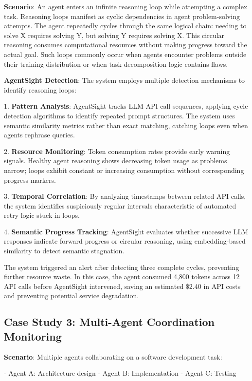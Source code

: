 \documentclass[sigplan,screen，review,9pt]{acmart}
\begin{document}
\textbf{Scenario}: An agent enters an infinite reasoning loop while attempting a complex task. Reasoning loops manifest as cyclic dependencies in agent problem-solving attempts. The agent repeatedly cycles through the same logical chain: needing to solve X requires solving Y, but solving Y requires solving X. This circular reasoning consumes computational resources without making progress toward the actual goal. Such loops commonly occur when agents encounter problems outside their training distribution or when task decomposition logic contains flaws.

\textbf{AgentSight Detection}: The system employs multiple detection mechanisms to identify reasoning loops:

1. \textbf{Pattern Analysis}: AgentSight tracks LLM API call sequences, applying cycle detection algorithms to identify repeated prompt structures. The system uses semantic similarity metrics rather than exact matching, catching loops even when agents rephrase queries.

2. \textbf{Resource Monitoring}: Token consumption rates provide early warning signals. Healthy agent reasoning shows decreasing token usage as problems narrow; loops exhibit constant or increasing consumption without corresponding progress markers.

3. \textbf{Temporal Correlation}: By analyzing timestamps between related API calls, the system identifies suspiciously regular intervals characteristic of automated retry logic stuck in loops.

4. \textbf{Semantic Progress Tracking}: AgentSight evaluates whether successive LLM responses indicate forward progress or circular reasoning, using embedding-based similarity to detect semantic stagnation.

The system triggered an alert after detecting three complete cycles, preventing further resource waste. In this case, the agent consumed 4,800 tokens across 12 API calls before AgentSight intervened, saving an estimated \$2.40 in API costs and preventing potential service degradation.

\subsection{Case Study 3: Multi-Agent Coordination Monitoring}

\textbf{Scenario}: Multiple agents collaborating on a software development task:

- Agent A: Architecture design
- Agent B: Implementation
- Agent C: Testing
\end{document}

